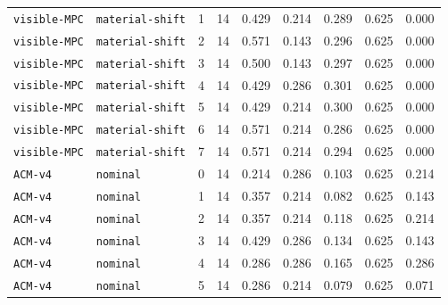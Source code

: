 \documentclass{article}
\begin{document}
\begin{center}
\begin{tabular}{llccccccc}
\texttt{visible-MPC} & \texttt{material-shift} & 1 & 14 & 0.429 & 0.214 & 0.289 & 0.625 & 0.000 \\
\texttt{visible-MPC} & \texttt{material-shift} & 2 & 14 & 0.571 & 0.143 & 0.296 & 0.625 & 0.000 \\
\texttt{visible-MPC} & \texttt{material-shift} & 3 & 14 & 0.500 & 0.143 & 0.297 & 0.625 & 0.000 \\
\texttt{visible-MPC} & \texttt{material-shift} & 4 & 14 & 0.429 & 0.286 & 0.301 & 0.625 & 0.000 \\
\texttt{visible-MPC} & \texttt{material-shift} & 5 & 14 & 0.429 & 0.214 & 0.300 & 0.625 & 0.000 \\
\texttt{visible-MPC} & \texttt{material-shift} & 6 & 14 & 0.571 & 0.214 & 0.286 & 0.625 & 0.000 \\
\texttt{visible-MPC} & \texttt{material-shift} & 7 & 14 & 0.571 & 0.214 & 0.294 & 0.625 & 0.000 \\
\texttt{ACM-v4} & \texttt{nominal} & 0 & 14 & 0.214 & 0.286 & 0.103 & 0.625 & 0.214 \\
\texttt{ACM-v4} & \texttt{nominal} & 1 & 14 & 0.357 & 0.214 & 0.082 & 0.625 & 0.143 \\
\texttt{ACM-v4} & \texttt{nominal} & 2 & 14 & 0.357 & 0.214 & 0.118 & 0.625 & 0.214 \\
\texttt{ACM-v4} & \texttt{nominal} & 3 & 14 & 0.429 & 0.286 & 0.134 & 0.625 & 0.143 \\
\texttt{ACM-v4} & \texttt{nominal} & 4 & 14 & 0.286 & 0.286 & 0.165 & 0.625 & 0.286 \\
\texttt{ACM-v4} & \texttt{nominal} & 5 & 14 & 0.286 & 0.214 & 0.079 & 0.625 & 0.071 \\
\bottomrule
\end{tabular}
\end{center}
\end{document}
